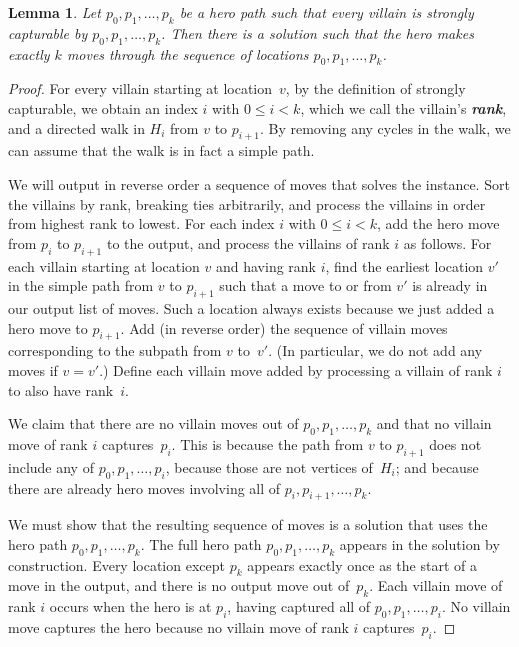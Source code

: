 \documentclass[11pt,letterpaper]{article}
\def\defn#1{\textbf{\textit{\boldmath #1}}}
\theoremstyle{plain}
\newtheorem{lemma}[theorem]{Lemma}
\theoremstyle{definition}
\theoremstyle{remark}
\numberwithin{equation}{section}
\begin{document}
\begin{lemma}
  \label{lem:strongly-capturable-soln}
  Let \(p_0, p_1, \ldots, p_k\) be a hero path
  such that every villain is strongly capturable by \(p_0, p_1, \ldots, p_k\).
  Then there is a solution such that the hero makes exactly $k$ moves
  through the sequence of locations $p_0, p_1, \ldots, p_k$.
\end{lemma}
\begin{proof}
  For every villain starting at location~$v$,
  by the definition of strongly capturable,
  we obtain an index \(i\) with $0 \leq i < k$,
  which we call the villain's \defn{rank},
  and a directed walk in \(H_i\) from \(v\) to \(p_{i+1}\).
  By removing any cycles in the walk, we can assume that the walk
  is in fact a simple path.

  We will output in reverse order a sequence of moves
  that solves the instance.
  Sort the villains by rank, breaking ties arbitrarily,
  and process the villains in order from highest rank to lowest.
  For each index \(i\) with \(0 \leq i < k\),
  add the hero move from $p_i$ to $p_{i+1}$ to the output,
  and process the villains of rank $i$ as follows.
  For each villain starting at location $v$ and having rank \(i\),
  find the earliest location $v'$ in the simple path
  from $v$ to $p_{i+1}$ such that a move to or from $v'$
  is already in our output list of moves.
  Such a location always exists because we just added a hero move to $p_{i+1}$.
  Add (in reverse order) the sequence of villain moves corresponding to the
  subpath from $v$ to~$v'$.
  (In particular, we do not add any moves if $v=v'$.)
  Define each villain move added by processing a villain of rank \(i\)
  to also have rank~\(i\).

  We claim that there are no villain moves out of \(p_0, p_1, \ldots, p_k\)
  and that no villain move of rank \(i\) captures~\(p_i\).
  This is because the path from \(v\) to \(p_{i+1}\)
  does not include any of \(p_0, p_1, \ldots, p_i\),
  because those are not vertices of~\(H_i\);
  and because there are already hero moves
  involving all of \(p_i, p_{i+1}, \ldots, p_k\).

  We must show that the resulting sequence of moves is a solution
  that uses the hero path $p_0, p_1, \ldots, p_k$.
  The full hero path \(p_0, p_1, \ldots, p_k\) appears in the solution
  by construction.
  Every location except $p_k$ appears exactly once as the start of a move
  in the output, and there is no output move out of~\(p_k\).
  Each villain move of rank \(i\) occurs when the hero is at \(p_i\),
  having captured all of \(p_0, p_1, \ldots, p_i\).
  No villain move captures the hero because no villain move of rank \(i\)
  captures~\(p_i\).


\end{proof}
\end{document}
